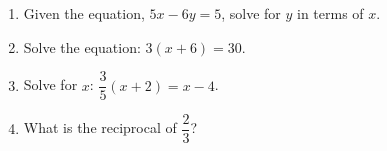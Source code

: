 \documentclass{article}
\begin{document}
\begin{enumerate}
  \item Given the equation, $5x-6y=5$, solve for $y$ in terms of $x$.

  \begin{enumerate}
  \end{enumerate}

\item Solve the equation: $3(x+6)=30$.

  \begin{enumerate}
  \end{enumerate}

\item Solve for $x$: $\dfrac{3}{5}(x+2)=x-4$.

  \begin{enumerate}
  \end{enumerate}


\item What is the reciprocal of $\dfrac{2}{3}$?

  \begin{enumerate}
  \end{enumerate}

\end{enumerate}
\end{document}
